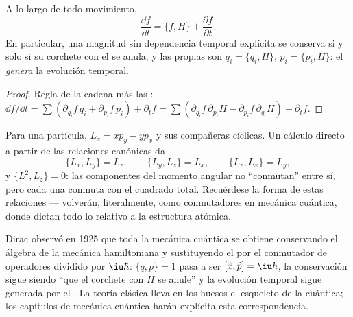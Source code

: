 \begin{theorem}\label{thm:b3:hamiltonian-mechanics:evolution}
A lo largo de todo movimiento,
\[
\frac{\dd f}{\dd t} = \{f, H\} + \frac{\partial f}{\partial t} .
\]
En particular, una magnitud sin dependencia temporal explícita se conserva
si y solo si su corchete con el  se anula; y las propias
 son $\dot q_i = \{q_i, H\}$, $\dot p_i
= \{p_i, H\}$: el  \emph{genera} la evolución temporal.
\end{theorem}

\begin{proof}
Regla de la cadena más las : $\dd f/\dd t = \sum(
\partial_{q_i}f\,\dot q_i + \partial_{p_i}f\,\dot p_i) + \partial_tf =
\sum(\partial_{q_i}f\,\partial_{p_i}H - \partial_{p_i}f\,
\partial_{q_i}H) + \partial_tf$.
\end{proof}

\begin{example}\label{ex:b3:hamiltonian-mechanics:brackets}
Para una partícula, $L_z = xp_y - yp_x$ y sus compañeras cíclicas. Un
cálculo directo a partir de las relaciones canónicas da
\[
\{L_x, L_y\} = L_z , \qquad
\{L_y, L_z\} = L_x , \qquad
\{L_z, L_x\} = L_y ,
\]
y $\{L^2, L_z\} = 0$: las componentes del momento angular no ``conmutan''
entre sí, pero cada una conmuta con el cuadrado total. Recuérdese la forma de
estas relaciones --- volverán, literalmente, como conmutadores en mecánica
cuántica, donde dictan todo lo relativo a la estructura atómica.
\end{example}

\begin{remark}\label{rem:b3:hamiltonian-mechanics:doorway}
Dirac observó en 1925 que toda la mecánica cuántica se obtiene conservando
el álgebra de la mecánica hamiltoniana y sustituyendo el 
por el conmutador de operadores dividido por
$\iu\hbar$: $\{q, p\} = 1$ pasa a ser $[\hat x, \hat p] = \iu\hbar$, la
conservación sigue siendo ``que el corchete con $H$ se anule'' y la
evolución temporal sigue generada por el . La teoría clásica
lleva en los huesos el esqueleto de la cuántica; los capítulos de mecánica
cuántica harán explícita esta correspondencia.
\end{remark}

